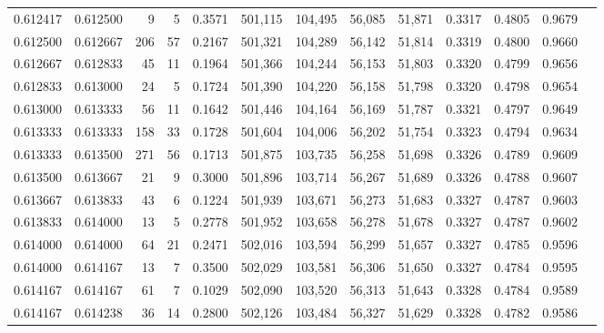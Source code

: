 \begin{tabular}{rrrrrrrrrrrrr}
0.612417 & 0.612500 &     9 &   5 &                                     0.3571 & 501,115 & 104,495 &  56,085 &  51,871 & 0.3317 & 0.4805 & 0.9679 \\
0.612500 & 0.612667 &   206 &  57 &                                     0.2167 & 501,321 & 104,289 &  56,142 &  51,814 & 0.3319 & 0.4800 & 0.9660 \\
0.612667 & 0.612833 &    45 &  11 &                                     0.1964 & 501,366 & 104,244 &  56,153 &  51,803 & 0.3320 & 0.4799 & 0.9656 \\
0.612833 & 0.613000 &    24 &   5 &                                     0.1724 & 501,390 & 104,220 &  56,158 &  51,798 & 0.3320 & 0.4798 & 0.9654 \\
0.613000 & 0.613333 &    56 &  11 &                                     0.1642 & 501,446 & 104,164 &  56,169 &  51,787 & 0.3321 & 0.4797 & 0.9649 \\
0.613333 & 0.613333 &   158 &  33 &                                     0.1728 & 501,604 & 104,006 &  56,202 &  51,754 & 0.3323 & 0.4794 & 0.9634 \\
0.613333 & 0.613500 &   271 &  56 &                                     0.1713 & 501,875 & 103,735 &  56,258 &  51,698 & 0.3326 & 0.4789 & 0.9609 \\
0.613500 & 0.613667 &    21 &   9 &                                     0.3000 & 501,896 & 103,714 &  56,267 &  51,689 & 0.3326 & 0.4788 & 0.9607 \\
0.613667 & 0.613833 &    43 &   6 &                                     0.1224 & 501,939 & 103,671 &  56,273 &  51,683 & 0.3327 & 0.4787 & 0.9603 \\
0.613833 & 0.614000 &    13 &   5 &                                     0.2778 & 501,952 & 103,658 &  56,278 &  51,678 & 0.3327 & 0.4787 & 0.9602 \\
0.614000 & 0.614000 &    64 &  21 &                                     0.2471 & 502,016 & 103,594 &  56,299 &  51,657 & 0.3327 & 0.4785 & 0.9596 \\
0.614000 & 0.614167 &    13 &   7 &                                     0.3500 & 502,029 & 103,581 &  56,306 &  51,650 & 0.3327 & 0.4784 & 0.9595 \\
0.614167 & 0.614167 &    61 &   7 &                                     0.1029 & 502,090 & 103,520 &  56,313 &  51,643 & 0.3328 & 0.4784 & 0.9589 \\
0.614167 & 0.614238 &    36 &  14 &                                     0.2800 & 502,126 & 103,484 &  56,327 &  51,629 & 0.3328 & 0.4782 & 0.9586 \\

\end{tabular}
